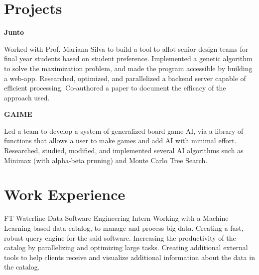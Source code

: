 \documentclass[10pt, oneside, openany]{article} %
\begin{document}
\begin{paracol}{2}
\begin{supertabular}{ll}
\end{supertabular}



\section{Projects}

{\raggedright\textbf{Junto}\\}

Worked with Prof. Mariana Silva to build a tool to allot senior design teams for final year students based on student preference. Implemented a genetic algorithm to solve the maximization problem, and made the program accessible by building a web-app. Researched, optimized, and parallelized a backend server capable of efficient processing. Co-authored a paper to document the efficacy of the approach used.\\

{\raggedright\textbf{GAIME}\\}

Led a team to develop a system of generalized board game AI, via a library of functions that allows a user to make games and add AI with minimal effort. Researched, studied, modified, and implemented several AI algorithms such as Minimax (with alpha-beta pruning) and Monte Carlo Tree Search.


\section{Work Experience}




{FT} %
{Waterline Data} %
{Software Engineering Intern} %
{Working with a Machine Learning-based data catalog, to manage and process big data. Creating a fast, robust query engine for the said software. Increasing the productivity of the catalog by parallelizing and optimizing large tasks. Creating additional external tools to help clients receive and visualize additional information about the data in the catalog.}%


\end{paracol}
\end{document}
